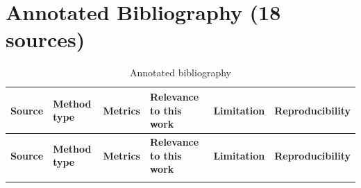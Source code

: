 \documentclass[11pt]{article}
\begin{document}
\section{Annotated Bibliography (18 sources)}

\begin{small}
\begin{longtable}{p{2.4cm} p{1.6cm} p{1.6cm} p{2.5cm} p{2.2cm} p{2.5cm}}
\caption{Annotated bibliography} \\
\toprule
\textbf{Source} & \textbf{Method type} & \textbf{Metrics} & \textbf{Relevance to this work} & \textbf{Limitation} & \textbf{Reproducibility} \\
\midrule
\endfirsthead
\toprule
\textbf{Source} & \textbf{Method type} & \textbf{Metrics} & \textbf{Relevance to this work} & \textbf{Limitation} & \textbf{Reproducibility} \\
\midrule
\endhead
\bottomrule
\endfoot


\end{longtable}
\end{small}
\end{document}
